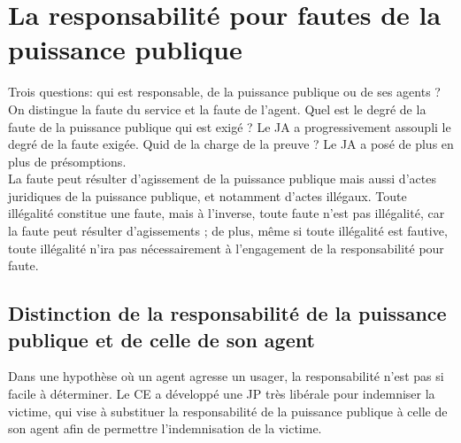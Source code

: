 \documentclass[10pt, a4paper, openany]{book}
\begin{document}
\chapter{La responsabilité pour fautes de la puissance publique}

Trois questions: qui est responsable, de la puissance publique ou de ses agents ? On distingue la faute du service et la faute de l'agent. Quel est le degré de la faute de la puissance publique qui est exigé ? Le JA a progressivement assoupli le degré de la faute exigée. Quid de la charge de la preuve ? Le JA a posé de plus en plus de présomptions. \\
La faute peut résulter d'agissement de la puissance publique mais aussi d'actes juridiques de la puissance publique, et notamment d'actes illégaux. Toute illégalité constitue une faute, mais à l'inverse, toute faute n'est pas illégalité, car la faute peut résulter d'agissements ; de plus, même si toute illégalité est fautive, toute illégalité n'ira pas nécessairement à l'engagement de la responsabilité pour faute. 

\section{Distinction de la responsabilité de la puissance publique et de celle de son agent}

Dans une hypothèse où un agent agresse un usager, la responsabilité n'est pas si facile à déterminer. Le CE a développé une JP très libérale pour indemniser la victime, qui vise à substituer la responsabilité de la puissance publique à celle de son agent afin de permettre l'indemnisation de la victime. 
\end{document}
